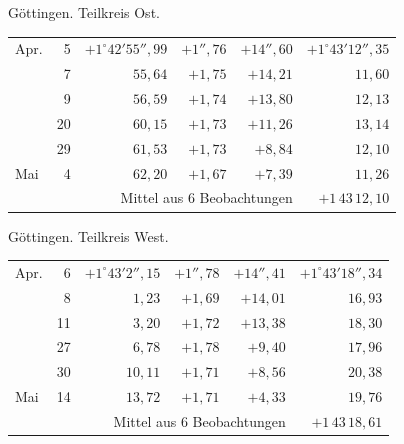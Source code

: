 \noindent\begin{minipage}[t]{.495\textwidth}\centering Göttingen. Teilkreis Ost.\par\smallskip
{\scriptsize\setlength{\tabcolsep}{1pt}\renewcommand{\arraystretch}{1.2}\begin{tabular}{lr|r|r|r|r|}
Apr.&5&$+1^\circ42'55''{,}99$&$+1''{,}76$&$+14''{,}60$&$+1^\circ43'12''{,}35$\\
&7&$55{,}64$&$+1{,}75$&$+14{,}21$&$11{,}60$\\
&9&$56{,}59$&$+1{,}74$&$+13{,}80$&$12{,}13$\\
&20&$60{,}15$&$+1{,}73$&$+11{,}26$&$13{,}14$\\
&29&$61{,}53$&$+1{,}73$&$+8{,}84$&$12{,}10$\\
Mai&4&$62{,}20$&$+1{,}67$&$+7{,}39$&$11{,}26$\\
\cline{6-6}\multicolumn{5}{r}{Mittel aus 6 Beobachtungen}&$+1\,43\,12{,}10$
\end{tabular}}\end{minipage}\hfill\begin{minipage}[t]{.495\textwidth}\centering Göttingen. Teilkreis West.\par\smallskip
{\scriptsize\setlength{\tabcolsep}{1pt}\renewcommand{\arraystretch}{1.2}\begin{tabular}{lr|r|r|r|r}
Apr.&6&$+1^\circ43'2''{,}15$&$+1''{,}78$&$+14''{,}41$&$+1^\circ43'18''{,}34$\\
&8&$1{,}23$&$+1{,}69$&$+14{,}01$&$16{,}93$\\
&11&$3{,}20$&$+1{,}72$&$+13{,}38$&$18{,}30$\\
&27&$6{,}78$&$+1{,}78$&$+9{,}40$&$17{,}96$\\
&30&$10{,}11$&$+1{,}71$&$+8{,}56$&$20{,}38$\\
Mai&14&$13{,}72$&$+1{,}71$&$+4{,}33$&$19{,}76$\\
\cline{6-6}\multicolumn{5}{r}{Mittel aus 6 Beobachtungen}&$+1\,43\,18{,}61$
\end{tabular}}\end{minipage}
\par\vspace{4mm}

